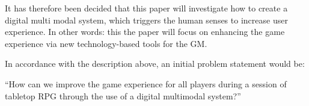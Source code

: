 It has therefore been decided that this paper will investigate how to create a digital multi modal system, which triggers the human senses to increase user experience. In other words: this the paper will focus on enhancing the game experience via new technology-based tools for the GM. 

In accordance with the description above, an initial problem statement would be:

“How can we improve the game experience for all players during a session of tabletop RPG through the use of a digital multimodal system?”  
